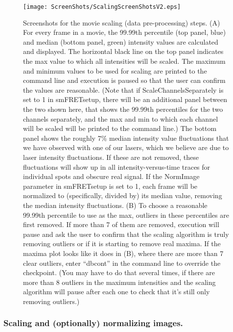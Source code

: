 \documentclass[11pt]{article}
\begin{document}
\begin{figure}
\begin{center}
\texttt{[image: ScreenShots/ScalingScreenShotsV2.eps]}
\caption{Screenshots for the movie scaling (data pre-processing) steps. (A) For every frame in a movie, the 99.99th percentile (top panel, blue) and median (bottom panel, green) intensity values are calculated and displayed.  The horizontal black line on the top panel indicates the max value to which all intensities will be scaled.  %
The maximum and minimum values to be used for scaling are printed to the command line and execution is paused so that the user can confirm the values are reasonable. (Note that if ScaleChannelsSeparately is set to 1 in smFRETsetup, there will be an additional panel between the two shown here, that shows the 99.99th percentiles for the two channels separately, and the max and min to which each channel will be scaled will be printed to the command line.)  The bottom panel shows the roughly 7\% median intensity value fluctuations that we have observed with one of our lasers, which we believe are due to laser intensity fluctuations.  If these are not removed, these fluctuations will show up in all intensity-versus-time traces for individual spots and obscure real signal.  If the NormImage parameter in smFRETsetup is set to 1, each frame will be normalized to (specifically, divided by) its median value, removing the median intensity fluctuations.  (B) To choose a reasonable 99.99th percentile to use as the max, outliers in these percentiles are first removed. If more than 7 of them are removed, execution will pause and ask the user to confirm that the scaling algorithm is truly removing outliers or if it is starting to remove real maxima.  If the maxima plot looks like it does in (B), where there are more than 7 clear outliers, enter ``dbcont'' in the command line to override the checkpoint.  (You may have to do that several times, if there are more than 8 outliers in the maximum intensities and the scaling algorithm will pause after each one to check that it's still only removing outliers.)}
\label{fig:ScaleMovieShot}
\end{center}
\end{figure}

\subsubsection{Scaling and (optionally) normalizing images.}
\end{document}

